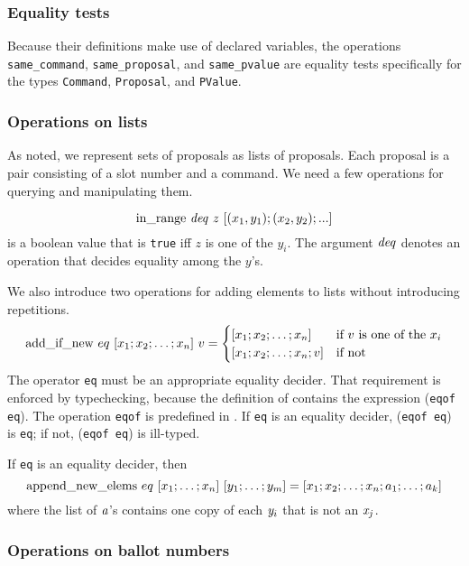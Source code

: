 \documentclass[final]{article}
\newcommand{\listinline}[1]{\text{\lstinline{#1}}}
\begin{document}
\subsubsection{Equality tests}

Because their definitions make use of declared variables, the
operations \lstinline{same_command}, \lstinline{same_proposal}, and
\lstinline{same_pvalue} are equality tests specifically for the types
\lstinline{Command}, \lstinline{Proposal}, and \lstinline{PValue}.

\subsubsection{Operations on lists}

As noted, we represent sets of proposals as lists of proposals.  Each
proposal is a pair consisting of a slot number and a command.  We need
a few operations for querying and manipulating them.

\[
\listinline{in_range}~\NUPRL{deq}~z~[(x_1,y_1); (x_2,y_2); ...]
\] 
is a boolean value that is \lstinline{true} iff $z$ is one of the
$y_i$.  The argument $\mathit{deq}$ denotes an operation that decides
equality among the $y$'s.

\vspace{1.0ex}
%
We also introduce two operations for adding elements to lists without
introducing repetitions.
\[
\listinline{add_if_new}~eq~[x_1;x_2;\ldots;x_n]~v =
   \begin{cases}
   [x_1;x_2;\ldots;x_n] & \text{if $v$ is one of the $x_i$}   \\
   [x_1;x_2;\ldots;x_n;v] & \text{if not}
   \end{cases}
\]
The operator \lstinline{eq} must be an appropriate equality decider.
That requirement is enforced by typechecking, because the definition
of \listinline{add_if_new} contains the expression 
%
(\lstinline{eqof eq}).  The operation \lstinline{eqof} is predefined
in \eml.  If \lstinline{eq} is an equality decider, 
%
(\lstinline{eqof eq}) is \lstinline{eq}; if not, (\lstinline{eqof eq})
is ill-typed.
\vspace{1.0ex}

If \lstinline{eq} is an equality decider, then
\[
\listinline{append_new_elems}~eq~[x_1;\ldots;x_n]~[y_1;\ldots;y_m]
  = [x_1;x_2;\ldots;x_n; a_1;\ldots;a_k]
\]
where the list of $\mathit{a}$'s contains one copy of each $\mathit{y}_i$
that is not an $\mathit{x}_j$.

\subsubsection{Operations on ballot numbers}
\end{document}
